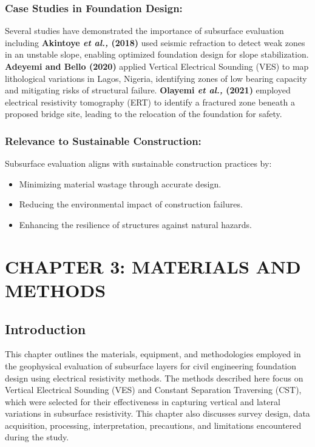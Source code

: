 \documentclass[12pt,a4paper]{report}
\begin{document}
\subsection{Case Studies in Foundation Design:}
Several studies have demonstrated the importance of subsurface evaluation including \textbf{Akintoye \textit{et al.,} (2018)} used seismic refraction to detect weak zones in an unstable slope, enabling optimized foundation design for slope stabilization. \textbf{Adeyemi and Bello (2020)} applied Vertical Electrical Sounding (VES) to map lithological variations in Lagos, Nigeria, identifying zones of low bearing capacity and mitigating risks of structural failure. \textbf{Olayemi \textit{et al.,} (2021)} employed electrical resistivity tomography (ERT) to identify a fractured zone beneath a proposed bridge site, leading to the relocation of the foundation for safety.


\subsection{Relevance to Sustainable Construction:}
Subsurface evaluation aligns with sustainable construction practices by:
\begin{itemize}
    \item Minimizing material wastage through accurate design.
    \item Reducing the environmental impact of construction failures.
    \item Enhancing the resilience of structures against natural hazards.
\end{itemize}

\chapter{CHAPTER 3: MATERIALS AND METHODS}

\section{Introduction}
This chapter outlines the materials, equipment, and methodologies employed in the geophysical evaluation of subsurface layers for civil engineering foundation design using electrical resistivity methods. The methods described here focus on Vertical Electrical Sounding (VES) and Constant Separation Traversing (CST), which were selected for their effectiveness in capturing vertical and lateral variations in subsurface resistivity. This chapter also discusses survey design, data acquisition, processing, interpretation, precautions, and limitations encountered during the study.
\end{document}
